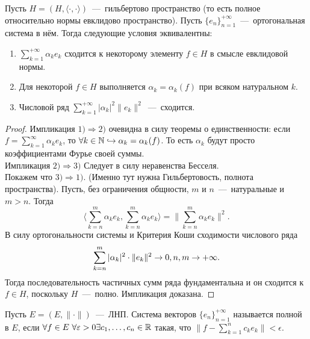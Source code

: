 \begin{theorem}
    Пусть $H = (H, \langle \cdot, \cdot \rangle)$~---~гильбертово пространство (то есть полное относительно нормы евклидово пространство).
    Пусть $\{e_n\}_{n = 1}^{+\infty}$~---~ортогональная система в нём.
    Тогда следующие условия эквивалентны:
    \begin{enumerate}
        \item $\sum\limits_{k = 1}^{+\infty} \alpha_k e_k$ сходится к некоторому элементу $f \in H$ в смысле евклидовой нормы.
        \item Для некоторой $f \in H$ выполняется $\alpha_k = \alpha_k(f)$ при всяком натуральном $k$.
        \item Числовой ряд $\sum\limits_{k = 1}^{+\infty} |\alpha_k|^2\|e_k\|^2$~---~сходится.
    \end{enumerate}
\end{theorem}
\begin{proof}
    Импликация $1) \Rightarrow 2)$ очевидна в силу теоремы о единственности: если $f = \sum_{k=1}^{\infty}\alpha_k e_k$, то $\forall k \in \mathbb{N} \hookrightarrow\alpha_k = \alpha_k(f)$. То есть $\alpha_k$ будут просто коэффициентами Фурье своей суммы. \\
    Импликация $2) \Rightarrow 3)$ Следует в силу неравенства Бесселя. \\
    Покажем что $3) \Rightarrow 1)$. (Именно тут нужна Гильбертовость, полнота пространства).
    Пусть, без ограничения общности, $m$ и $n$~---~натуральные и $m > n$.
    Тогда
    \begin{equation*}
        \bigr\langle \sum\limits_{k = n}^{m} \alpha_k e_k, \sum\limits_{k = n}^m \alpha_k e_k \bigr\rangle = \big\|\sum\limits_{k = n}^m \alpha_k e_k\big\|^2.
    \end{equation*}
    В силу ортогональности системы и Критерия Коши сходимости числового ряда
    \[
        \sum\limits_{k = n}^m |\alpha_k|^2 \cdot\|e_k\|^2 \rightarrow 0, n, m \rightarrow +\infty.
    \]
    Тогда последовательность частичных сумм ряда фундаментальна и он сходится к $f \in H$, поскольку $H$~---~полно.
    Импликация доказана.
\end{proof}
\begin{definition}
    Пусть $E = (E,  \|\cdot\|)$~---~ЛНП.
    Система векторов $\{e_n\}_{n = 1}^{+\infty}$ называется полной в $E$, если $\forall f \in E \ \forall \varepsilon > 0 \exists c_1, \ldots, c_n \in \mathbb{R}$
    такая, что $\|f - \sum\limits_{k = 1}^n c_k e_k\| < \epsilon$.
\end{definition}
